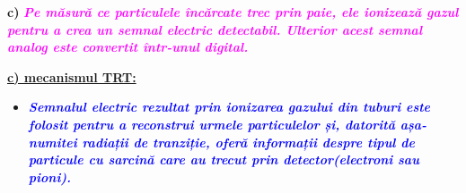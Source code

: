 \documentclass{beamer}
\begin{document}
\begin{frame}{\textbf{c)}}
\vspace{3.5cm}
 \makebox[0.5cm]{} \textbf{ \textit{\textcolor{magenta}{Pe măsură ce particulele încărcate trec prin paie, ele ionizează gazul pentru a crea un semnal electric detectabil. Ulterior acest semnal analog este convertit într-unul digital. }}}

\end{frame}



\begin{frame}{\href{https://www.youtube.com/watch?v=gljjW2Pqz5g&t=410s}{\textbf{c) mecanismul TRT:}}}

\vspace{-0.5cm}

\small

\begin{itemize}

\small 
\item[\ding{66}]\makebox[0.5cm]{} \textcolor{blue}{\textbf{\textit{
Semnalul electric rezultat prin ionizarea gazului din tuburi este folosit pentru a reconstrui urmele particulelor și, datorită așa-numitei radiații de tranziție, oferă informații despre tipul de particule cu sarcină care au trecut prin detector(electroni sau pioni).}}}

\end{itemize}




\end{frame}
\end{document}
